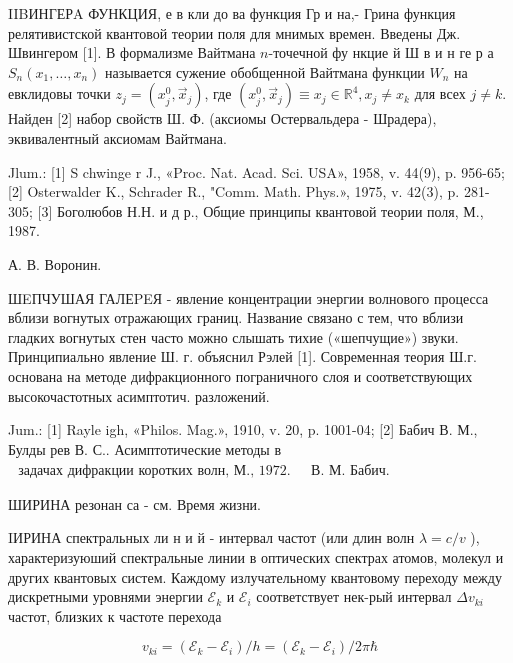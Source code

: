\documentclass[10pt]{article}
\begin{document}
IIBИНГЕРA ФУНКЦИЯ, е в кли до ва функция Гр и на,- Грина функция релятивистской квантовой теории поля для мнимых времен. Введены Дж. Швингером [1]. В формализме Вайтмана $n$-точечной фу нкцие й Ш в и н ге р а $S_{n}\left(x_{1}, \ldots, x_{n}\right)$ называется сужение обобщенной Вайтмана функции $W_{n}$ на евклидовы точки $z_{j}=\left(x_{j}^{0}, \vec{x}_{j}\right)$, где $\left(x_{j}^{0}, \vec{x}_{j}\right) \equiv x_{j} \in \mathbb{R}^{4}, x_{j} \neq x_{k}$ для всех $j \neq k$. Найден [2] набор свойств Ш. Ф. (аксиомы Остервальдера - Шрадера), эквивалентный аксиомам Вайтмана.



Jlum.: [1] S chwinge r J., «Proc. Nat. Acad. Sci. USA», 1958, v. 44(9), p. 956-65; [2] Osterwalder K., Schrader R., "Comm. Math. Phys.», 1975, v. 42(3), p. 281-305; [3] Боголюбов Н.Н. и д р., Общие принципы квантовой теории поля, М., 1987.



А. В. Воронин.



ШEПЧУШАЯ ГАЛЕPEЯ - явление концентрации энергии волнового процесса вблизи вогнутых отражающих границ. Название связано с тем, что вблизи гладких вогнутых стен часто можно слышать тихие («шепчущие») звуки. Принципиально явление Ш. г. объяснил Рэлей [1]. Современная теория Ш.г. основана на методе дифракционного пограничного слоя и соответствующих высокочастотных асимптотич. разложений.



Jum.: [1] Rayle igh, «Philos. Mag.», 1910, v. 20, p. 1001-04; [2] Бабич В. М., Булды рев В. С.. Асимптотические методы в $\begin{array}{ll}\text { задачах дифракции коротких волн, М., 1972. } & \text { В. М. Бабич. }\end{array}$



ШИРИНА резонан са - см. Время жизни.



IИРИНА спектральных ли н и й - интервал частот (или длин волн $\lambda=c / v$ ), характеризуюший спектральные линии в оптических спектрах атомов, молекул и других квантовых систем. Каждому излучательному квантовому переходу между дискретными уровнями энергии $\mathscr{E}_{k}$ и $\mathscr{E}_{i}$ соответствует нек-рый интервал $\Delta v_{k i}$ частот, близких к частоте перехода



\[

v_{k i}=\left(\mathscr{E}_{k}-\mathscr{E}_{i}\right) / h=\left(\mathscr{E}_{k}-\mathscr{E}_{i}\right) / 2 \pi \hbar

\]
\end{document}

